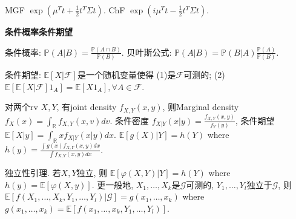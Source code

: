 \documentclass[UTF8]{ctexart}
\begin{document}
MGF  $\exp \left( \mu^T t + \frac{1}{2} t^T \Sigma t \right)$.
ChF $\exp \left( i \mu^T t - \frac{1}{2} t^T \Sigma t \right)$.

\noindent \textbf{条件概率条件期望}

条件概率: $\mathbb{P}(A|B)=\frac{\mathbb{P}(A\cap B)}{\mathbb{P}(B)}$.
贝叶斯公式: $\mathbb{P}(A|B) = \mathbb{P}(B|A) \frac{\mathbb{P}(A)}{\mathbb{P}(B)}$.

条件期望:
$\mathbb{E}[X|\mathcal{F}]$是一个随机变量使得
(1)是$\mathcal{F}$可测的;
(2)$\mathbb{E}[\mathbb{E}[X|\mathcal{F}]1_A]=\mathbb{E}[X 1_A], \forall A \in\mathcal{F}$.

对两个rv $X,Y$, 有joint density $f_{X,Y}(x,y)$, 则Marginal density $f_X(x)=\int_{\mathbb{R}} f_{X,Y}(x,v)dv$.
条件密度 $f_{X|Y}(x|y) = \frac{f_{X,Y}(x,y)}{f_Y(y)}$,
条件期望 $\mathbb{E}[X|y]=\int_{\mathbb{R}}xf_{X|Y}(x|y)dx$.
$\mathbb{E}[g(X)|Y]=h(Y)$ where
$h(y) = \frac{\int g(x)f_{X,Y}(x,y)dx}{\int f_{X,Y}(x,y)dx}$.

独立性引理. 若$X, Y$独立, 则 $\mathbb{E}[\varphi(X,Y)|Y]=h(Y)$ where
$h(y)=\mathbb{E}[\varphi(X,y)]$.
更一般地, $X_1,\dots,X_k$是$\mathcal{G}$可测的, $Y_1,\dots,Y_l$独立于$\mathcal{G}$,
则$\mathbb{E}[f(X_1,\dots,X_k,Y_1,\dots,Y_l)|\mathcal{G}]=g(x_1,\dots,x_k)$
where $g(x_1,\dots,x_k)=\mathbb{E}[f(x_1,\dots,x_k,Y_1,\dots,Y_l)]$. \\
\end{document}
